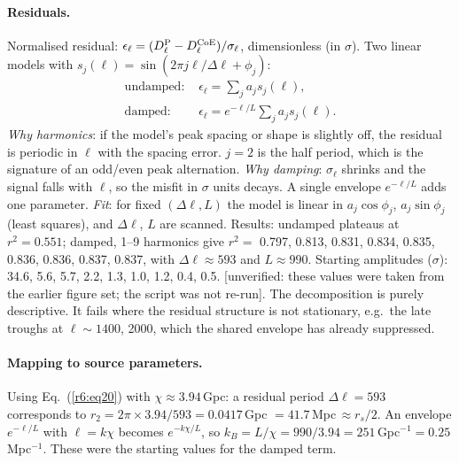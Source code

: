 \documentclass[11pt]{article}
\newcommand{\flag}[1]{\textsf{[unverified: #1]}}
\begin{document}
\paragraph{Residuals.} Normalised residual: $\epsilon_\ell=(D^{\rm P}_\ell-D^{\rm CoE}_\ell)/\sigma_\ell$, dimensionless (in $\sigma$). Two linear models with $s_j(\ell)=\sin(2\pi j\ell/\Delta\ell+\phi_j)$:
\begin{align}
\text{undamped: }&\epsilon_\ell=\textstyle\sum_ja_js_j(\ell),\label{r6:eq22}\\
\text{damped: }&\epsilon_\ell=e^{-\ell/L}\textstyle\sum_ja_js_j(\ell).\label{r6:eq23}
\end{align}
\emph{Why harmonics}: if the model's peak spacing or shape is slightly off, the residual is periodic in $\ell$ with the spacing error. $j=2$ is the half period, which is the signature of an odd/even peak alternation. \emph{Why damping}: $\sigma_\ell$ shrinks and the signal falls with $\ell$, so the misfit in $\sigma$ units decays. A single envelope $e^{-\ell/L}$ adds one parameter. \emph{Fit}: for fixed $(\Delta\ell,L)$ the model is linear in $a_j\cos\phi_j$, $a_j\sin\phi_j$ (least squares), and $\Delta\ell$, $L$ are scanned. Results: undamped plateaus at $r^2=0.551$; damped, 1--9 harmonics give $r^2=$ 0.797, 0.813, 0.831, 0.834, 0.835, 0.836, 0.836, 0.837, 0.837, with $\Delta\ell\approx593$ and $L\approx990$. Starting amplitudes ($\sigma$): 34.6, 5.6, 5.7, 2.2, 1.3, 1.0, 1.2, 0.4, 0.5. \flag{these values were taken from the earlier figure set; the script was not re-run}. The decomposition is purely descriptive. It fails where the residual structure is not stationary, e.g.\ the late troughs at $\ell\sim1400$, 2000, which the shared envelope has already suppressed.

\paragraph{Mapping to source parameters.} Using Eq.~(\ref{r6:eq20}) with $\chi\approx3.94$\,Gpc: a residual period $\Delta\ell=593$ corresponds to $r_2=2\pi\times3.94/593=0.0417$\,Gpc $=41.7$\,Mpc$\,\approx r_s/2$. An envelope $e^{-\ell/L}$ with $\ell=k\chi$ becomes $e^{-k\chi/L}$, so $k_B=L/\chi=990/3.94=251$\,Gpc$^{-1}=0.25$\,Mpc$^{-1}$. These were the starting values for the damped term.
\end{document}
